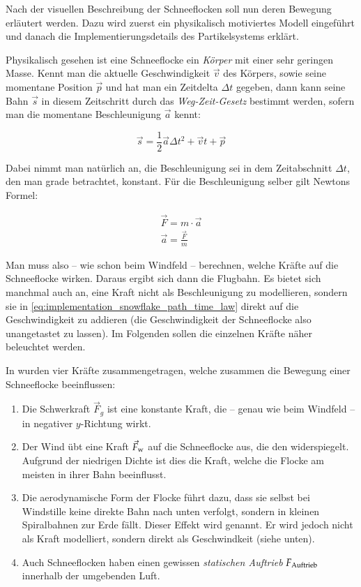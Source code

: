 Nach der visuellen Beschreibung der Schneeflocken soll nun deren
Bewegung erläutert werden. Dazu wird zuerst ein physikalisch
motiviertes Modell eingeführt und danach die Implementierungsdetails
des Partikelsystems erklärt.

Physikalisch gesehen ist eine Schneeflocke ein \emph{Körper} mit einer
sehr geringen Masse. Kennt man die aktuelle Geschwindigkeit $\vec{v}$
des Körpers, sowie seine momentane Position $\vec{p}$ und hat man ein
Zeitdelta $\Delta t$ gegeben, dann kann seine Bahn $\vec{s}$ in diesem
Zeitschritt durch das \emph{Weg-Zeit-Gesetz} bestimmt werden, sofern
man die momentane Beschleunigung $\vec{a}$ kennt:

\begin{equation}
\label{eq:implementation_snowflake_path_time_law}
\vec{s} = \frac{1}{2} \vec{a} \Delta t^2 + \vec{v}t + \vec{p}
\end{equation}

Dabei nimmt man natürlich an, die Beschleunigung sei in dem
Zeitabschnitt $\Delta t$, den man grade betrachtet, konstant. Für die
Beschleunigung selber gilt Newtons Formel:

\begin{gather}
\vec{F} = m \cdot \vec{a} \\
\vec{a} = \frac{\vec{F}}{m}
\end{gather}

Man muss also -- wie schon beim Windfeld -- berechnen, welche Kräfte
auf die Schneeflocke wirken. Daraus ergibt sich dann die Flugbahn. Es
bietet sich manchmal auch an, eine Kraft nicht als Beschleunigung zu
modellieren, sondern sie in
\autoref{eq:implementation_snowflake_path_time_law} direkt auf die
Geschwindigkeit zu addieren (die Geschwindigkeit der Schneeflocke also
unangetastet zu lassen). Im Folgenden sollen die einzelnen Kräfte
näher beleuchtet werden.

In \cite{Aagaard2004} wurden vier Kräfte zusammengetragen, welche
zusammen die Bewegung einer Schneeflocke beeinflussen:

\begin{enumerate}
\item Die Schwerkraft $\vec{F}_g$ ist eine konstante Kraft, die
-- genau wie beim Windfeld -- in negativer $y$-Richtung wirkt.
\item Der Wind übt eine Kraft $\vec{F}_{\textnormal{w}}$
auf die Schneeflocke aus, die den 
widerspiegelt. Aufgrund der niedrigen Dichte ist dies die Kraft,
welche die Flocke am meisten in ihrer Bahn beeinflusst.
\item Die aerodynamische Form der Flocke führt dazu, dass sie selbst bei
Windstille keine direkte Bahn nach unten verfolgt, sondern in kleinen
Spiralbahnen zur Erde fällt. Dieser Effekt wird
 genannt. Er wird jedoch nicht
als Kraft modelliert, sondern direkt als Geschwindkeit (siehe unten).
\item Auch Schneeflocken haben einen gewissen \emph{statischen
Auftrieb} $F_{\textnormal{Auftrieb}}$ innerhalb der umgebenden
Luft.
\end{enumerate}

